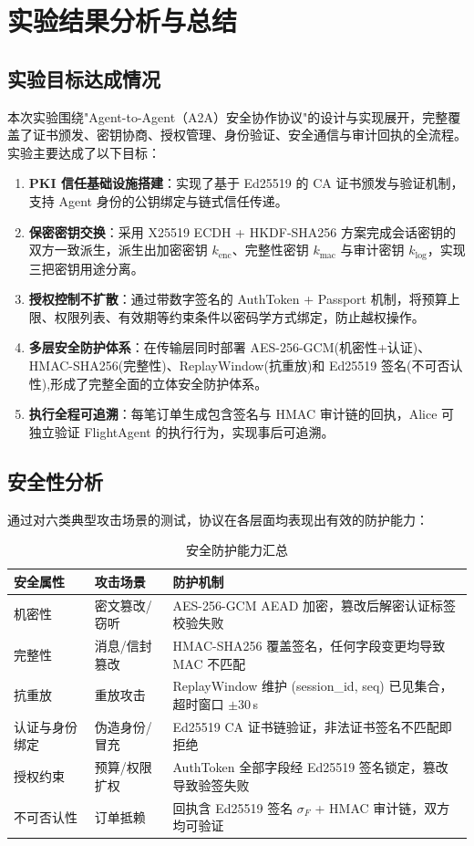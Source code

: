 \section{实验结果分析与总结}
\subsection{实验目标达成情况}
本次实验围绕"Agent-to-Agent（A2A）安全协作协议"的设计与实现展开，完整覆盖了证书颁发、密钥协商、授权管理、身份验证、安全通信与审计回执的全流程。实验主要达成了以下目标：

\begin{enumerate}[leftmargin=2em]
    \item \textbf{PKI 信任基础设施搭建}：实现了基于 Ed25519 的 CA 证书颁发与验证机制，支持 Agent 身份的公钥绑定与链式信任传递。
    \item \textbf{保密密钥交换}：采用 X25519 ECDH + HKDF-SHA256 方案完成会话密钥的双方一致派生，派生出加密密钥 $k_{\text{enc}}$、完整性密钥 $k_{\text{mac}}$ 与审计密钥 $k_{\log}$，实现三把密钥用途分离。
    \item \textbf{授权控制不扩散}：通过带数字签名的 AuthToken + Passport 机制，将预算上限、权限列表、有效期等约束条件以密码学方式绑定，防止越权操作。
    \item \textbf{多层安全防护体系}：在传输层同时部署 AES-256-GCM(机密性+认证)、HMAC-SHA256(完整性)、ReplayWindow(抗重放)和 Ed25519 签名(不可否认性),形成了完整全面的立体安全防护体系。
    \item \textbf{执行全程可追溯}：每笔订单生成包含签名与 HMAC 审计链的回执，Alice 可独立验证 FlightAgent 的执行行为，实现事后可追溯。
\end{enumerate}

\subsection{安全性分析}
通过对六类典型攻击场景的测试，协议在各层面均表现出有效的防护能力：

\begin{table}[H]
    \centering
    \caption{安全防护能力汇总}
    \small
    \begin{tabularx}{\textwidth}{@{}llX@{}}
        \toprule
        \textbf{安全属性} & \textbf{攻击场景} & \textbf{防护机制} \\
        \midrule
        机密性 & 密文篡改/窃听 & AES-256-GCM AEAD 加密，篡改后解密认证标签校验失败 \\
        完整性 & 消息/信封篡改 & HMAC-SHA256 覆盖签名，任何字段变更均导致 MAC 不匹配 \\
        抗重放 & 重放攻击 & ReplayWindow 维护 (session\_id, seq) 已见集合，超时窗口 $\pm 30$\,s \\
        认证与身份绑定 & 伪造身份/冒充 & Ed25519 CA 证书链验证，非法证书签名不匹配即拒绝 \\
        授权约束 & 预算/权限扩权 & AuthToken 全部字段经 Ed25519 签名锁定，篡改导致验签失败 \\
        不可否认性 & 订单抵赖 & 回执含 Ed25519 签名 $\sigma_F$ + HMAC 审计链，双方均可验证 \\
        \bottomrule
    \end{tabularx}
\end{table}

